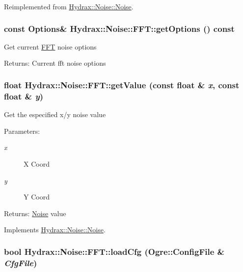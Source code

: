 Reimplemented from \hyperlink{class_hydrax_1_1_noise_1_1_noise_59f0e03e88a5de69065838adc35ff2d8}{Hydrax::Noise::Noise}.\hypertarget{class_hydrax_1_1_noise_1_1_f_f_t_5207977ba1623fef59570e8f2f1c738c}{
\subsubsection[{getOptions}]{\setlength{\rightskip}{0pt plus 5cm}const {\bf Options}\& Hydrax::Noise::FFT::getOptions () const}}
\label{class_hydrax_1_1_noise_1_1_f_f_t_5207977ba1623fef59570e8f2f1c738c}


Get current \hyperlink{class_hydrax_1_1_noise_1_1_f_f_t}{FFT} noise options \begin{Desc}
\item[Returns:]Current fft noise options \end{Desc}
\hypertarget{class_hydrax_1_1_noise_1_1_f_f_t_e7da5bf6c6ebfc9061ed433af6350ea7}{
\subsubsection[{getValue}]{\setlength{\rightskip}{0pt plus 5cm}float Hydrax::Noise::FFT::getValue (const float \& {\em x}, \/  const float \& {\em y})}}
\label{class_hydrax_1_1_noise_1_1_f_f_t_e7da5bf6c6ebfc9061ed433af6350ea7}


Get the especified x/y noise value \begin{Desc}
\item[Parameters:]
\begin{description}
\item[{\em x}]X Coord \item[{\em y}]Y Coord \end{description}
\end{Desc}
\begin{Desc}
\item[Returns:]\hyperlink{class_hydrax_1_1_noise_1_1_noise}{Noise} value \end{Desc}


Implements \hyperlink{class_hydrax_1_1_noise_1_1_noise_5b18138d5c2c5ea3c3659cef80dd3a3e}{Hydrax::Noise::Noise}.\hypertarget{class_hydrax_1_1_noise_1_1_f_f_t_64245b9e56eeb8627ac3f5260dc203dd}{
\subsubsection[{loadCfg}]{\setlength{\rightskip}{0pt plus 5cm}bool Hydrax::Noise::FFT::loadCfg (Ogre::ConfigFile \& {\em CfgFile})}}
\label{class_hydrax_1_1_noise_1_1_f_f_t_64245b9e56eeb8627ac3f5260dc203dd}


